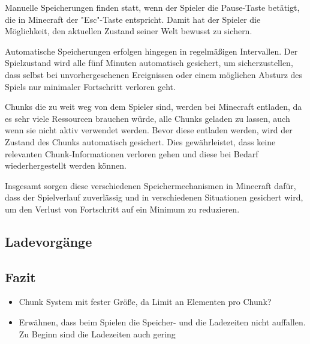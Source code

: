 Manuelle Speicherungen finden statt, wenn der Spieler die Pause-Taste betätigt, die in Minecraft der "Esc"-Taste entspricht. Damit hat der Spieler die Möglichkeit, den aktuellen Zustand seiner Welt bewusst zu sichern.\cite{minecraftSpielstandSpeicherung} 

Automatische Speicherungen erfolgen hingegen in regelmäßigen Intervallen. Der Spielzustand wird alle fünf Minuten automatisch gesichert, um sicherzustellen, dass selbst bei unvorhergesehenen Ereignissen oder einem möglichen Absturz des Spiels nur minimaler Fortschritt verloren geht.\cite{minecraftSpielstandSpeicherung}

Chunks die zu weit weg von dem Spieler sind, werden bei Minecraft entladen, da es sehr viele Ressourcen brauchen würde, alle Chunks geladen zu lassen, auch wenn sie nicht aktiv verwendet werden. Bevor diese entladen werden, wird der Zustand des Chunks automatisch gesichert. Dies gewährleistet, dass keine relevanten Chunk-Informationen verloren gehen und diese bei Bedarf wiederhergestellt werden können.\cite{minecraftSpielstandSpeicherung}

Insgesamt sorgen diese verschiedenen Speichermechanismen in Minecraft dafür, dass der Spielverlauf zuverlässig und in verschiedenen Situationen gesichert wird, um den Verlust von Fortschritt auf ein Minimum zu reduzieren.




\subsection{Ladevorgänge}



\subsection{Fazit}
\begin{itemize}
    \item Chunk System mit fester Größe, da Limit an Elementen pro Chunk?
    \item Erwähnen, dass beim Spielen die Speicher- und die Ladezeiten nicht auffallen. Zu Beginn sind die Ladezeiten auch gering
\end{itemize}




